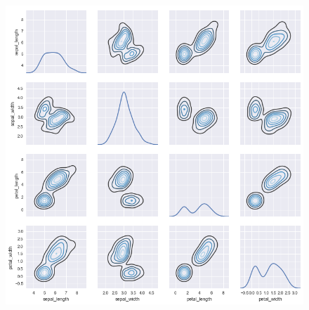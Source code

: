 \documentclass{beamer}
\begin{document}
\begin{frame}[fragile]
\begin{figure}
\centering
\includegraphics[width=0.7\linewidth]{images/distributions_44_1}
\caption{}
\label{fig:distributions_44_1}
\end{figure}
\end{frame}
\end{document}
